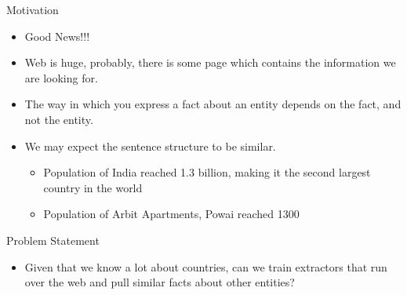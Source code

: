 \documentclass{beamer}
\begin{document}
\begin{frame}{Motivation}

\begin{itemize}
 \item  Good News!!! \pause
 \item  Web is huge, probably, there is some page which contains the information we are looking for. \pause
 \item The way in which you express a fact about an entity depends on the fact, and not the entity. \pause
 \item We may expect the sentence structure to be similar. \pause
 \begin{itemize}
    \item Population of India reached 1.3 billion, making it the second largest country in the world
    \item Population of Arbit Apartments, Powai reached 1300
 \end{itemize}
 
\end{itemize}
\end{frame}

\begin{frame}{Problem Statement}
 
 \begin{itemize}
  \item Given that we know a lot about countries, can we train extractors that run over the web and pull similar facts about other entities?
 \end{itemize}

 
\end{frame}
\end{document}
